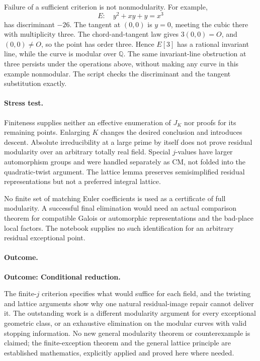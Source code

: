 \documentclass[11pt,a4paper]{article}
\newcommand{\Q}{\mathbb{Q}}
\numberwithin{equation}{section}
\begin{document}
Failure of a sufficient criterion is not nonmodularity. For example,
\[
 E:\quad y^2+xy+y=x^3
\]
has discriminant $-26$. The tangent at $(0,0)$ is $y=0$, meeting the cubic there with multiplicity three. The chord-and-tangent law gives $3(0,0)=O$, and $(0,0)\ne O$, so the point has order three. Hence $E[3]$ has a rational invariant line, while the curve is modular over $\Q$. The same invariant-line obstruction at three persists under the operations above, without making any curve in this example nonmodular. The script checks the discriminant and the tangent substitution exactly.

\paragraph{Stress test.}
Finiteness supplies neither an effective enumeration of $J_K$ nor proofs for its remaining points. Enlarging $K$ changes the desired conclusion and introduces descent. Absolute irreducibility at a large prime by itself does not prove residual modularity over an arbitrary totally real field. Special $j$-values have larger automorphism groups and were handled separately as CM, not folded into the quadratic-twist argument. The lattice lemma preserves semisimplified residual representations but not a preferred integral lattice.

No finite set of matching Euler coefficients is used as a certificate of full modularity. A successful final elimination would need an actual comparison theorem for compatible Galois or automorphic representations and the bad-place local factors. The notebook supplies no such identification for an arbitrary residual exceptional point.

\paragraph{Outcome.}
\textbf{Outcome: Conditional reduction.}

The finite-$j$ criterion specifies what would suffice for each field, and the twisting and lattice arguments show why one natural residual-image repair cannot deliver it. The outstanding work is a different modularity argument for every exceptional geometric class, or an exhaustive elimination on the modular curves with valid stopping information. No new general modularity theorem or counterexample is claimed; the finite-exception theorem and the general lattice principle are established mathematics, explicitly applied and proved here where needed.
\end{document}
